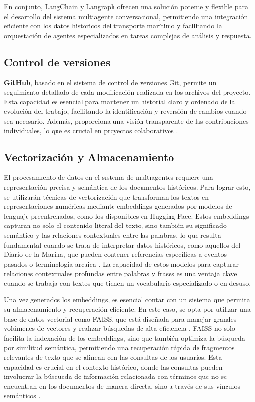 En conjunto, LangChain y Langraph ofrecen una solución potente y flexible para el desarrollo del sistema multiagente conversacional, permitiendo una integración eficiente con los datos históricos del transporte marítimo y facilitando la orquestación de agentes especializados en tareas complejas de análisis y respuesta.

\subsection{Control de versiones}

\textbf{GitHub}, basado en el sistema de control de versiones Git, permite un seguimiento detallado de cada modificación realizada en los archivos del proyecto. Esta capacidad es esencial para mantener un historial claro y ordenado de la evolución del trabajo, facilitando la identificación y reversión de cambios cuando sea necesario. Además, proporciona una visión transparente de las contribuciones individuales, lo que es crucial en proyectos colaborativos \cite{github_version_control,github_academic}. 

\subsection{Vectorización y Almacenamiento}

El procesamiento de datos en el sistema de multiagentes requiere una representación precisa y semántica de los documentos históricos. Para lograr esto, se utilizarán técnicas de vectorización que transforman los textos en representaciones numéricas mediante embeddings generados por modelos de lenguaje preentrenados, como los disponibles en Hugging Face. Estos embeddings capturan no solo el contenido literal del texto, sino también su significado semántico y las relaciones contextuales entre las palabras, lo que resulta fundamental cuando se trata de interpretar datos históricos, como aquellos del Diario de la Marina, que pueden contener referencias específicas a eventos pasados o terminología arcaica \cite{devlin2018bert, reimers2019sentence}. La capacidad de estos modelos para capturar relaciones contextuales profundas entre palabras y frases es una ventaja clave cuando se trabaja con textos que tienen un vocabulario especializado o en desuso.

Una vez generados los embeddings, es esencial contar con un sistema que permita su almacenamiento y recuperación eficiente. En este caso, se opta por utilizar una base de datos vectorial como FAISS, que está diseñada para manejar grandes volúmenes de vectores y realizar búsquedas de alta eficiencia \cite{mikolov2013efficient}. FAISS no solo facilita la indexación de los embeddings, sino que también optimiza la búsqueda por similitud semántica, permitiendo una recuperación rápida de fragmentos relevantes de texto que se alinean con las consultas de los usuarios. Esta capacidad es crucial en el contexto histórico, donde las consultas pueden involucrar la búsqueda de información relacionada con términos que no se encuentran en los documentos de manera directa, sino a través de sus vínculos semánticos \cite{mikolov2013efficient}.

